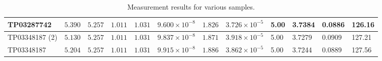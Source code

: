 \begin{table}[!ht]
\begin{tabular}{|l|l|l|l|l|l|l|l|l|l|l|l|}
    TP03287742 & $5.390  $ & $5.257  $ & $1.011  $ & $1.031  $ & $9.600 \times 10^{-8}$ & $1.826  $ & $3.726 \times 10^{-5}$ & 5.00 & 3.7384 & 0.0886 & 126.16 \\ \hline
    TP03348187 (2) & $5.130  $ & $5.257  $ & $1.011  $ & $1.031  $ & $9.837 \times 10^{-8}$ & $1.871  $ & $3.918 \times 10^{-5}$ & 5.00 & 3.7279 & 0.0909 & 127.21 \\ \hline
    TP03348187 & $5.204  $ & $5.257  $ & $1.011  $ & $1.031  $ & $9.915 \times 10^{-8}$ & $1.886  $ & $3.862 \times 10^{-5}$ & 5.00 & 3.7244 & 0.0889 & 127.56 \\ \hline
    \end{tabular}
    \caption{Measurement results for various samples.}
    \label{tab:measurement_results}
\end{table}